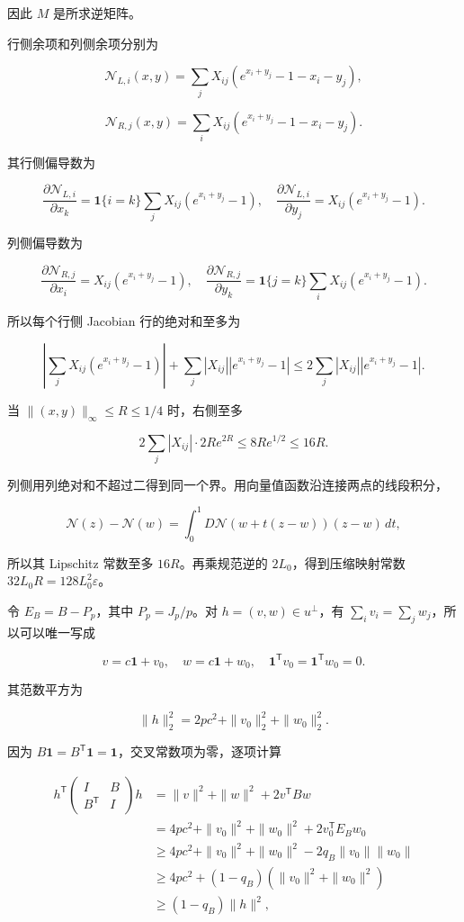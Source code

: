 \documentclass[11pt,a4paper]{article}
\begin{document}
因此 \(M\) 是所求逆矩阵。

行侧余项和列侧余项分别为

\[\mathcal N_{L,i}(x,y)=\sum_jX_{ij}(e^{x_i+y_j}-1-x_i-y_j),\]

\[\mathcal N_{R,j}(x,y)=\sum_iX_{ij}(e^{x_i+y_j}-1-x_i-y_j).\]

其行侧偏导数为

\[\frac{\partial\mathcal N_{L,i}}{\partial x_k}
=\mathbf1\{i=k\}\sum_jX_{ij}(e^{x_i+y_j}-1),\quad
\frac{\partial\mathcal N_{L,i}}{\partial y_j}=X_{ij}(e^{x_i+y_j}-1).\]

列侧偏导数为

\[\frac{\partial\mathcal N_{R,j}}{\partial x_i}=X_{ij}(e^{x_i+y_j}-1),\quad
\frac{\partial\mathcal N_{R,j}}{\partial y_k}
=\mathbf1\{j=k\}\sum_iX_{ij}(e^{x_i+y_j}-1).\]

所以每个行侧 Jacobian 行的绝对和至多为

\[\left|\sum_jX_{ij}(e^{x_i+y_j}-1)\right|
+\sum_j|X_{ij}||e^{x_i+y_j}-1|
\le2\sum_j|X_{ij}||e^{x_i+y_j}-1|.\]

当 \(\|(x,y)\|_\infty\le R\le1/4\) 时，右侧至多

\[2\sum_j|X_{ij}|\cdot2Re^{2R}\le8Re^{1/2}\le16R.\]

列侧用列绝对和不超过二得到同一个界。用向量值函数沿连接两点的线段积分，

\[\mathcal N(z)-\mathcal N(w)=\int_0^1D\mathcal N(w+t(z-w))(z-w)\,dt,\]

所以其 Lipschitz 常数至多 \(16R\)。再乘规范逆的 \(2L_0\)，得到压缩映射常数 \(32L_0R=128L_0^2\varepsilon\)。

令 \(E_B=B-P_p\)，其中 \(P_p=J_p/p\)。对 \(h=(v,w)\in u^\perp\)，有 \(\sum_iv_i=\sum_jw_j\)，所以可以唯一写成

\[v=c\mathbf1+v_0,\quad w=c\mathbf1+w_0,\quad
\mathbf1^{\mathsf T}v_0=\mathbf1^{\mathsf T}w_0=0.\]

其范数平方为

\[\|h\|_2^2=2pc^2+\|v_0\|_2^2+\|w_0\|_2^2.\]

因为 \(B\mathbf1=B^{\mathsf T}\mathbf1=\mathbf1\)，交叉常数项为零，逐项计算

\[\begin{aligned}
h^{\mathsf T}\begin{pmatrix}I&B\\B^{\mathsf T}&I\end{pmatrix}h
&=\|v\|^2+\|w\|^2+2v^{\mathsf T}Bw\\
&=4pc^2+\|v_0\|^2+\|w_0\|^2+2v_0^{\mathsf T}E_Bw_0\\
&\ge4pc^2+\|v_0\|^2+\|w_0\|^2-2q_B\|v_0\|\|w_0\|\\
&\ge4pc^2+(1-q_B)(\|v_0\|^2+\|w_0\|^2)\\
&\ge(1-q_B)\|h\|^2,
\end{aligned}\]
\end{document}

